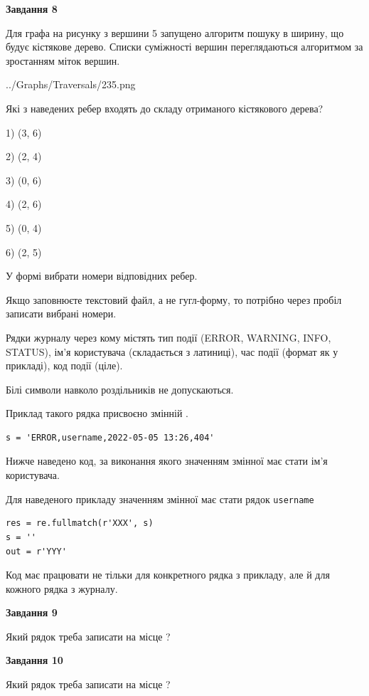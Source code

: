 \documentclass[12pt, ukrainian]{article}
\def\code#1{\Verb!#1!}
\begin{document}
{\begin {large}
{\begin {center}\textbf{Завдання 8}\end {center}}\par
Для графа на рисунку з вершини 5 запущено алгоритм пошуку в ширину, що будує кістякове дерево. Списки суміжності вершин переглядаються алгоритмом за зростанням міток вершин.\par
\begin{center}
	{../Graphs/Traversals/235.png}
\end{center}
\par Які з наведених ребер входять до складу отриманого кістякового дерева?\par
1) (3, 6)\par
2) (2, 4)\par
3) (0, 6)\par
4) (2, 6)\par
5) (0, 4)\par
6) (2, 5)\par
{\vskip 15pt} У формі вибрати номери відповідних ребер.


Якщо заповнюєте текстовий файл, а не гугл-форму, то потрібно через пробіл записа\-ти вибрані номери.\par
\newpage


Рядки журналу через кому містять тип події (ERROR, WARNING, INFO, STATUS), ім'я користувача (складається з латиниці), час події (фор\-мат як у прикладі), код події (ціле).

Білі символи навколо роздільників не допускаються.

Приклад такого рядка присвоєно змінній .



\begin{verbatim}
s = 'ERROR,username,2022-05-05 13:26,404'
\end{verbatim}


Нижче наведено код, за виконання якого значенням змінної  має стати ім'я користувача.

Для наведеного прикладу значенням змінної  має стати рядок \code{username}



\begin{verbatim}
res = re.fullmatch(r'XXX', s)
s = ''
out = r'YYY'
\end{verbatim}


Код має працювати не тільки для конкретного рядка з прикладу, але й для кожного рядка з журналу.

{\begin {center}\textbf{Завдання 9}\end {center}}\par
Який рядок треба записати на місце  ?\par
\vspace{5mm}


{\begin {center}\textbf{Завдання 10}\end {center}}\par
Який рядок треба записати на місце  ?\par


\newpage


\end {large}}
\end{document}
